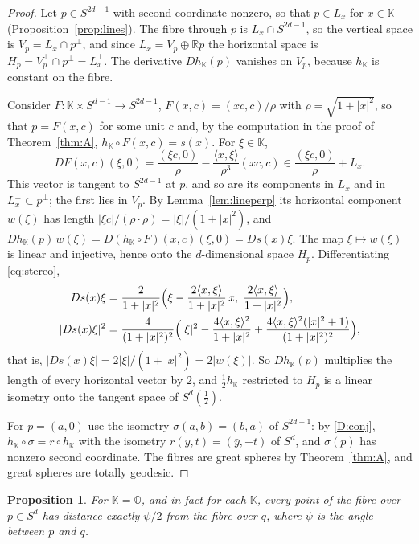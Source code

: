 \documentclass[11pt]{amsart}
\numberwithin{equation}{section}
\theoremstyle{plain}
\newtheorem{proposition}[theorem]{Proposition}
\theoremstyle{definition}
\theoremstyle{remark}
\newcommand{\R}{\mathbb{R}}
\newcommand{\Oc}{\mathbb{O}}
\newcommand{\K}{\mathbb{K}}
\begin{document}
\begin{proof}
Let $p\in S^{2d-1}$ with second coordinate nonzero, so that $p\in L_x$ for $x\in\K$ (Proposition~\ref{prop:lines}). The fibre through $p$ is $L_x\cap S^{2d-1}$, so the vertical space is $V_p=L_x\cap p^\perp$, and since $L_x=V_p\oplus\R p$ the horizontal space is $H_p=V_p^\perp\cap p^\perp=L_x^\perp$. The derivative $Dh_\K(p)$ vanishes on $V_p$, because $h_\K$ is constant on the fibre.

Consider $F\colon\K\times S^{d-1}\to S^{2d-1}$, $F(x,c)=(xc,c)/\rho$ with $\rho=\sqrt{1+|x|^2}$, so that $p=F(x,c)$ for some unit $c$ and, by the computation in the proof of Theorem~\ref{thm:A}, $h_\K\circ F(x,c)=s(x)$. For $\xi\in\K$,
\[
DF(x,c)(\xi,0)=\frac{(\xi c,0)}{\rho}-\frac{\langle x,\xi\rangle}{\rho^3}(xc,c)\in\frac{(\xi c,0)}{\rho}+L_x .
\]
This vector is tangent to $S^{2d-1}$ at $p$, and so are its components in $L_x$ and in $L_x^\perp\subset p^\perp$; the first lies in $V_p$. By Lemma~\ref{lem:lineperp} its horizontal component $w(\xi)$ has length $|\xi c|/(\rho\cdot\rho)=|\xi|/(1+|x|^2)$, and $Dh_\K(p)\,w(\xi)=D(h_\K\circ F)(x,c)(\xi,0)=Ds(x)\xi$. The map $\xi\mapsto w(\xi)$ is linear and injective, hence onto the $d$-dimensional space $H_p$. Differentiating \eqref{eq:stereo},
\begin{align*}
Ds(x)\xi&=\frac{2}{1+|x|^2}\Bigl(\xi-\frac{2\langle x,\xi\rangle}{1+|x|^2}\,x,\;\frac{2\langle x,\xi\rangle}{1+|x|^2}\Bigr),\\
|Ds(x)\xi|^2&=\frac{4}{(1+|x|^2)^2}\Bigl(|\xi|^2-\frac{4\langle x,\xi\rangle^2}{1+|x|^2}+\frac{4\langle x,\xi\rangle^2(|x|^2+1)}{(1+|x|^2)^2}\Bigr),
\end{align*}
that is, $|Ds(x)\xi|=2|\xi|/(1+|x|^2)=2|w(\xi)|$. So $Dh_\K(p)$ multiplies the length of every horizontal vector by $2$, and $\tfrac12h_\K$ restricted to $H_p$ is a linear isometry onto the tangent space of $S^d(\tfrac12)$.

For $p=(a,0)$ use the isometry $\sigma(a,b)=(b,a)$ of $S^{2d-1}$: by \ref{D:conj}, $h_\K\circ\sigma=r\circ h_\K$ with the isometry $r(y,t)=(\bar y,-t)$ of $S^d$, and $\sigma(p)$ has nonzero second coordinate. The fibres are great spheres by Theorem~\ref{thm:A}, and great spheres are totally geodesic.
\end{proof}

\begin{proposition}\label{prop:octparallel}
For $\K=\Oc$, and in fact for each $\K$, every point of the fibre over $p\in S^d$ has distance exactly $\psi/2$ from the fibre over $q$, where $\psi$ is the angle between $p$ and $q$.
\end{proposition}
\end{document}

